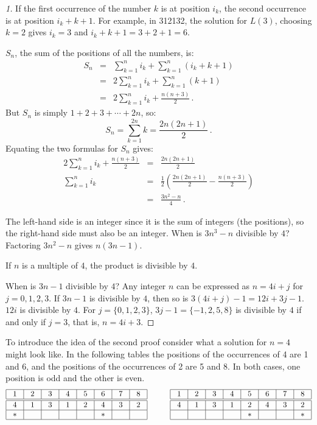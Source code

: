 \begin{proof}[1] If the first occurrence of the number $k$ is at position $i_k$, the second occurrence is at position $i_k+k+1$. For example, in 3{}1{}2{}1{}3{}2, the solution for $L(3)$,  choosing $k=2$ gives $i_k=3$ and $i_k+k+1=3+2+1=6$.

$S_n$, the sum of the positions of all the numbers, is:
\begin{eqnarray*}
S_n&=&\sum_{k=1}^{n}i_k+\sum_{k=1}^{n}(i_k+k+1)\\
& =& 2\sum_{k=1}^{n}i_k+\sum_{k=1}^{n}(k+1)\\
&=& 2\sum_{k=1}^{n}i_k+\frac{n(n+3)}{2}\,.
\end{eqnarray*}
But $S_n$ is simply $1+2+3+\cdots+2n$, so:
\[
S_n=\sum_{k=1}^{2n}k = \frac{2n(2n+1)}{2}\,.
\]
Equating the two formulas for $S_n$ gives:
\begin{eqnarray*}
2\sum_{k=1}^{n}i_k+\frac{n(n+3)}{2} &=& \frac{2n(2n+1)}{2}\\
\sum_{k=1}^{n}i_k &=& \frac{1}{2}\left(\frac{2n(2n+1)}{2} - \frac{n(n+3)}{2}\right) \\
&=& \frac{3n^2-n}{4}\,.
\end{eqnarray*}

The left-hand side is an integer since it is the sum of integers (the positions), so the right-hand side must also be an integer. When is $3n^3-n$ divisible by $4$? Factoring $3n^2-n$ gives $n(3n-1)$.

If $n$ is a multiple of $4$, the product is divisible by $4$.

When is $3n-1$ divisible by $4$? Any integer $n$ can be expressed as $n=4i+j$ for $j=0,1,2,3$. If $3n-1$ is divisible by $4$, then so is $3(4i+j)-1 = 12i+3j-1$. $12i$ is divisible by $4$. For $j=\{0,1,2,3\}$, $3j-1=\{-1,2,5,8\}$ is divisible by $4$ if and only if $j=3$, that is, $n=4i+3$.
\end{proof}

\newpage

To introduce the idea of the second proof consider what a solution for $n=4$ might look like. In the following tables the positions of the occurrences of 4 are 1 and 6, and the positions of the occurrences of 2 are 5 and 8. In both cases, one position is odd and the other is even. 
\[
\addtolength{\arraycolsep}{4pt}
\begin{array}{|c|c|c|c|c|c|c|c|}
\hline
1&2&3&4&5&6&7&8\\
\hline\hline
4&1&3&1&2&4&3&2\\\hline
*&&&&&*&&\\\hline
\end{array}
\hspace{3em}
\begin{array}{|c|c|c|c|c|c|c|c|}
\hline
1&2&3&4&5&6&7&8\\
\hline\hline
4&1&3&1&2&4&3&2\\\hline
&&&&*&&&*\\\hline
\end{array}
\]


